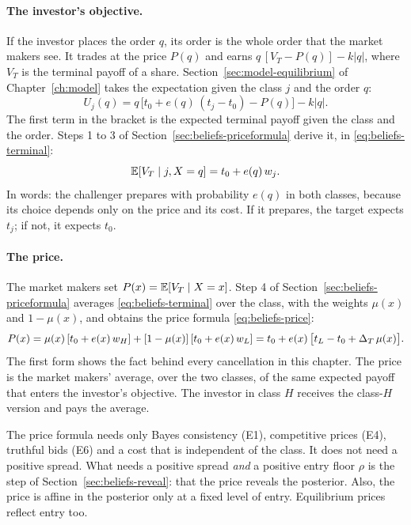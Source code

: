 \paragraph{The investor's objective.} If the investor places the order \(q\), its order is the whole order that the
market makers see. It trades at the price \(P(q)\) and earns \(q\,[V_T-P(q)]-k|q|\), where \(V_T\) is the terminal
payoff of a share. Section~\ref{sec:model-equilibrium} of Chapter~\ref{ch:model} takes the expectation given the class \(j\) and
the order \(q\):
\begin{equation}\label{eq:trading-objective}
U_j(q)=q\,\bigl[t_0+e(q)\,(t_j-t_0)-P(q)\bigr]-k|q| .
\end{equation}
The first term in the bracket is the expected terminal payoff given the class and the order. Steps 1 to 3 of
Section~\ref{sec:beliefs-priceformula} derive it, in \eqref{eq:beliefs-terminal}:
\[
\mathbb{E}[V_T\mid j,X=q]=t_0+e(q)\,w_j .
\]
In words: the challenger prepares with probability \(e(q)\) in both classes, because its choice depends only on the
price and its cost. If it prepares, the target expects \(t_j\); if not, it expects \(t_0\).

\paragraph{The price.} The market makers set \(P(x)=\mathbb{E}[V_T\mid X=x]\). Step 4 of
Section~\ref{sec:beliefs-priceformula} averages \eqref{eq:beliefs-terminal} over the class, with the weights
\(\mu(x)\) and \(1-\mu(x)\), and obtains the price formula \eqref{eq:beliefs-price}:
\[
P(x)=\mu(x)\,[t_0+e(x)\,w_H]+[1-\mu(x)]\,[t_0+e(x)\,w_L]=t_0+e(x)\,\bigl[t_L-t_0+\Delta_T\,\mu(x)\bigr].
\]
The first form shows the fact behind every cancellation in this chapter. The price is the market makers' average,
over the two classes, of the same expected payoff that enters the investor's objective. The investor in class \(H\)
receives the class-\(H\) version and pays the average.

\begin{watchout}
The price formula needs only Bayes consistency (E1), competitive prices (E4), truthful bids (E6) and a cost that is
independent of the class. It does not need a positive spread. What needs a positive spread \emph{and} a positive
entry floor \(\rho\) is the step of Section~\ref{sec:beliefs-reveal}: that the price reveals the posterior. Also,
the price is affine in the posterior only at a fixed level of entry. Equilibrium prices reflect entry too.
\end{watchout}

